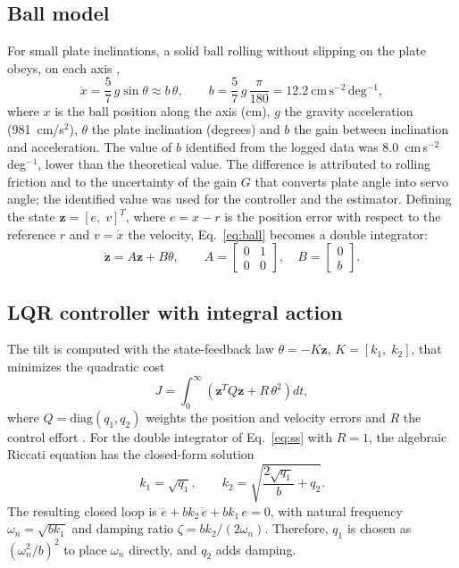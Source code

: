 \documentclass[11pt,letterpaper]{article}
\begin{document}
\subsection{Ball model}
For small plate inclinations, a solid ball rolling without slipping on
the plate obeys, on each axis \cite{Awtar2002,Hauser1992},
\begin{equation}
\ddot{x} = \frac{5}{7}\, g \sin\theta \approx b\,\theta ,
\qquad b = \frac{5}{7}\,g\,\frac{\pi}{180} = 12.2~\mathrm{cm\,s^{-2}\,deg^{-1}},
\label{eq:ball}
\end{equation}
where $x$ is the ball position along the axis (cm), $g$ the gravity
acceleration (981~cm/s$^2$), $\theta$ the plate inclination (degrees)
and $b$ the gain between inclination and acceleration. The value of $b$
identified from the logged data was $8.0$~cm\,s$^{-2}$\,deg$^{-1}$,
lower than the theoretical value. The difference is attributed to
rolling friction and to the uncertainty of the gain $G$ that converts
plate angle into servo angle; the identified value was used for the
controller and the estimator. Defining the state
$\mathbf{z}=[e,\;v]^T$, where $e=x-r$ is the position error with
respect to the reference $r$ and $v=\dot x$ the velocity,
Eq.~\eqref{eq:ball} becomes a double integrator:
\begin{equation}
\dot{\mathbf{z}} = A\mathbf{z} + B\theta,\qquad
A=\begin{bmatrix}0&1\\0&0\end{bmatrix},\quad
B=\begin{bmatrix}0\\ b\end{bmatrix}.
\label{eq:ss}
\end{equation}

\subsection{LQR controller with integral action}
\label{sec:lqr}
The tilt is computed with the state-feedback law $\theta=-K\mathbf{z}$,
$K=[k_1,\;k_2]$, that minimizes the quadratic cost
\begin{equation}
J=\int_0^\infty\left(\mathbf{z}^TQ\mathbf{z}+R\,\theta^2\right)dt ,
\label{eq:cost}
\end{equation}
where $Q=\mathrm{diag}(q_1,q_2)$ weights the position and velocity
errors and $R$ the control effort \cite{Anderson1990}. For the double
integrator of Eq.~\eqref{eq:ss} with $R=1$, the algebraic Riccati
equation has the closed-form solution
\begin{equation}
k_1=\sqrt{q_1},\qquad
k_2=\sqrt{\frac{2\sqrt{q_1}}{b}+q_2} .
\label{eq:gains}
\end{equation}
The resulting closed loop is $\ddot e + b k_2\,\dot e + b k_1\,e = 0$,
with natural frequency $\omega_n=\sqrt{b k_1}$ and damping ratio
$\zeta=b k_2/(2\omega_n)$. Therefore, $q_1$ is chosen as
$(\omega_n^2/b)^2$ to place $\omega_n$ directly, and $q_2$ adds damping.
\end{document}
